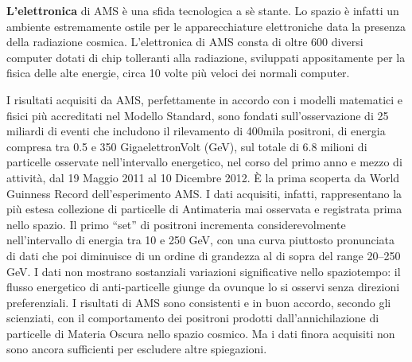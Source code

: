 \documentclass[12pt,a4paper]{article}
\begin{document}
\textbf{L’elettronica} di AMS è una sfida tecnologica a sè stante. Lo spazio è infatti un ambiente estremamente ostile per le apparecchiature elettroniche data la presenza della radiazione cosmica. L’elettronica di AMS consta di oltre 600 diversi computer dotati di chip tolleranti alla radiazione, sviluppati appositamente per la fisica delle alte energie, circa 10 volte più veloci dei normali computer.

I risultati acquisiti da AMS, perfettamente in accordo con i modelli matematici e fisici più accreditati nel Modello Standard, sono fondati sull’osservazione di 25 miliardi di eventi che includono il rilevamento di 400mila positroni, di energia compresa tra 0.5 e 350 GigaelettronVolt (GeV), sul totale di 6.8 milioni di particelle osservate nell’intervallo energetico, nel corso del primo anno e mezzo di attività, dal 19 Maggio 2011 al 10 Dicembre 2012. È la prima scoperta da World Guinness Record dell’esperimento AMS. I dati acquisiti, infatti, rappresentano la più estesa collezione di particelle di Antimateria mai osservata e registrata prima nello spazio. Il primo “set” di positroni incrementa considerevolmente nell’intervallo di energia tra 10 e 250 GeV, con una curva piuttosto pronunciata di dati che poi diminuisce di un ordine di grandezza al di sopra del range 20--250 GeV. I dati non mostrano sostanziali variazioni significative nello spaziotempo: il flusso energetico di anti-particelle giunge da ovunque lo si osservi senza direzioni preferenziali. I risultati di AMS sono consistenti e in buon accordo, secondo gli scienziati, con il comportamento dei positroni prodotti dall’annichilazione di particelle di Materia Oscura nello spazio cosmico. Ma i dati finora acquisiti non sono ancora sufficienti per escludere altre spiegazioni.
\end{document}
